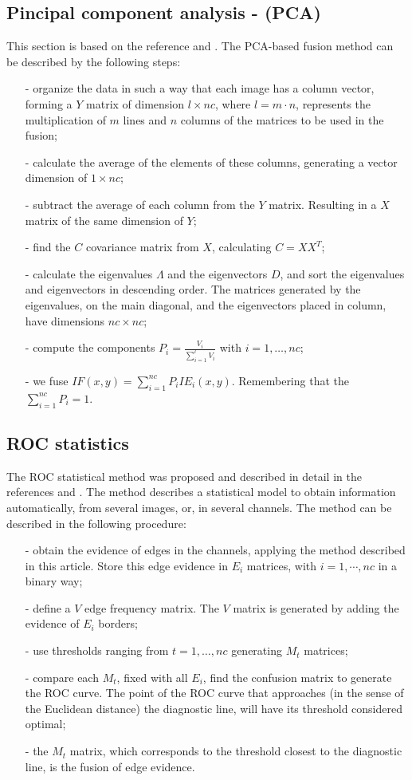 \documentclass[conference]{IEEEtran}
\begin{document}
{{{{\subsection{Pincipal component analysis - (PCA) }
This section is based on the reference \cite{n_r} and \cite{mit}. The PCA-based fusion method can be described by the following steps:
\begin{itemize}
\item[-] organize the data in such a way that each image has a column vector, forming a $Y$ matrix of dimension $l\times nc$, where $l=m\cdot n$, represents the multiplication of $m$ lines and $n$ columns of the matrices to be used in the fusion;
\item[-] calculate the average of the elements of these columns, generating a vector dimension of $1\times nc$;
\item[-] subtract the average of each column from the $Y$ matrix. Resulting in a $X$ matrix of the same dimension of $Y$; 
\item[-] find the $C$ covariance matrix from $X$, calculating $C=XX^T$;
\item[-] calculate the eigenvalues $\Lambda$ and the eigenvectors $D$, and sort the eigenvalues and eigenvectors in descending order. The matrices generated by the eigenvalues, on the main diagonal, and the eigenvectors placed in column, have dimensions $nc\times nc$;
\item[-] compute the components $P_i=\frac{V_i}{\sum_{i=1}^l V_i}$ with $i=1,\dots,nc$;
\item[-] we fuse $IF(x,y)=\sum_{i=1}^{nc}P_iIE_i(x,y)$. Remembering that the $\sum_{i=1}^{nc}P_i=1$.
\end{itemize}

\subsection{ROC statistics}
The ROC statistical method was proposed and described in detail in the references \cite{gs} and \cite{fawcett}. The method describes a statistical model to obtain information automatically, from several images, or, in several channels. The method can be described in the following procedure:
\begin{itemize}
\item[-] obtain the evidence of edges in the channels, applying the method described in this article. Store this edge evidence in $E_i$ matrices, with $i=1,\cdots,nc$ in a binary way;
\item[-] define a $V$ edge frequency matrix. The $V$ matrix is generated by adding the evidence of $E_i$ borders;
\item[-] use thresholds ranging from $t=1,\dots,nc$ generating $M_t$ matrices;
\item[-] compare each $M_t$, fixed with all $E_i$, find the confusion matrix to generate the ROC curve. The point of the ROC curve that approaches (in the sense of the Euclidean distance) the diagnostic line, will have its threshold considered optimal;
\item[-] the $M_t$ matrix, which corresponds to the threshold closest to the diagnostic line, is the fusion of edge evidence.
\end{itemize}

}}}}
\end{document}
